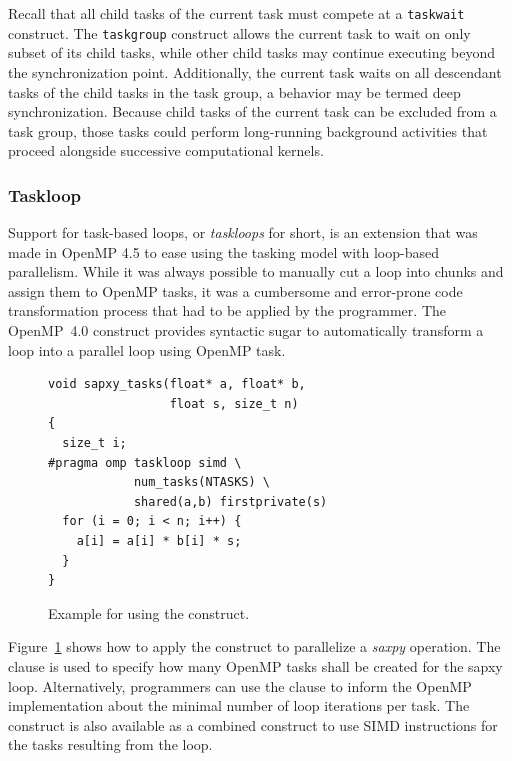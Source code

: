


Recall that all child tasks of the current task must compete at a \texttt{taskwait} construct.  The \texttt{taskgroup} construct allows the current task to wait on only subset of its child tasks, while other child tasks may continue executing beyond the synchronization point.  Additionally, the current task waits on all descendant tasks of the child tasks in the task group, a behavior may be termed deep synchronization.  Because child tasks of the current task can be excluded from a task group, those tasks could perform long-running background activities that proceed alongside successive computational kernels.






\subsubsection{Taskloop}
\label{sec:Taskloop}

Support for task-based loops, or \emph{taskloops} for short, is  an extension that was made in OpenMP 4.5 to ease using the tasking model with loop-based parallelism.
While it was always possible to manually cut a loop into chunks and assign them to OpenMP tasks, it was a cumbersome and error-prone code transformation process that had to be applied by the programmer.
The OpenMP~4.0  construct provides syntactic sugar to automatically transform a loop into a parallel loop using OpenMP task.

\begin{figure}
\begin{verbatim}
void sapxy_tasks(float* a, float* b,
                 float s, size_t n)
{
  size_t i;
#pragma omp taskloop simd \
            num_tasks(NTASKS) \
            shared(a,b) firstprivate(s)
  for (i = 0; i < n; i++) {
    a[i] = a[i] * b[i] * s;
  }
}
\end{verbatim}
\caption{Example for using the  construct.\label{fig:TaskloopExample}}
\end{figure}

Figure~\ref{fig:TaskloopExample} shows how to apply the  construct to parallelize a \emph{saxpy} operation.
The  clause is used to specify how many OpenMP tasks shall be created for the sapxy loop.
Alternatively, programmers can use the \code{grainsize} clause to inform the OpenMP implementation about the minimal number of loop iterations per task.
The \code{taskloop} construct is also available as a combined construct to use SIMD instructions for the tasks resulting from the loop.
